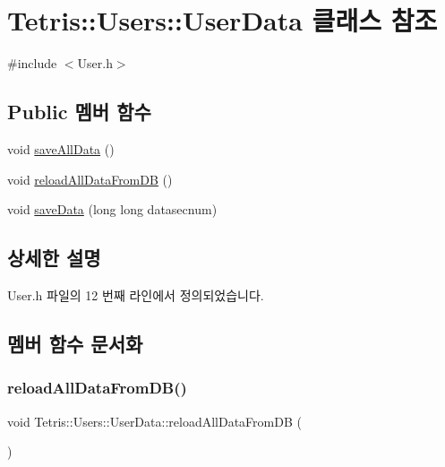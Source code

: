 \hypertarget{class_tetris_1_1_users_1_1_user_data}{}\section{Tetris\+:\+:Users\+:\+:User\+Data 클래스 참조}
\label{class_tetris_1_1_users_1_1_user_data}


{\ttfamily \#include $<$User.\+h$>$}

\subsection*{Public 멤버 함수}
\begin{DoxyCompactItemize}
\item 
void \hyperlink{class_tetris_1_1_users_1_1_user_data_a0910f2f58efaa7d215804802144db8be}{save\+All\+Data} ()
\item 
void \hyperlink{class_tetris_1_1_users_1_1_user_data_af35019c1e222aef020c2e167fc6cf05d}{reload\+All\+Data\+From\+DB} ()
\item 
void \hyperlink{class_tetris_1_1_users_1_1_user_data_a18d94f063a675f9f1310745c9a5fd882}{save\+Data} (long long datasecnum)
\end{DoxyCompactItemize}


\subsection{상세한 설명}


User.\+h 파일의 12 번째 라인에서 정의되었습니다.



\subsection{멤버 함수 문서화}
\mbox{\label{class_tetris_1_1_users_1_1_user_data_af35019c1e222aef020c2e167fc6cf05d}} 
\subsubsection{\texorpdfstring{reload\+All\+Data\+From\+D\+B()}{reloadAllDataFromDB()}}
{\footnotesize\ttfamily void Tetris\+::\+Users\+::\+User\+Data\+::reload\+All\+Data\+From\+DB (\begin{DoxyParamCaption}{ }\end{DoxyParamCaption})}

